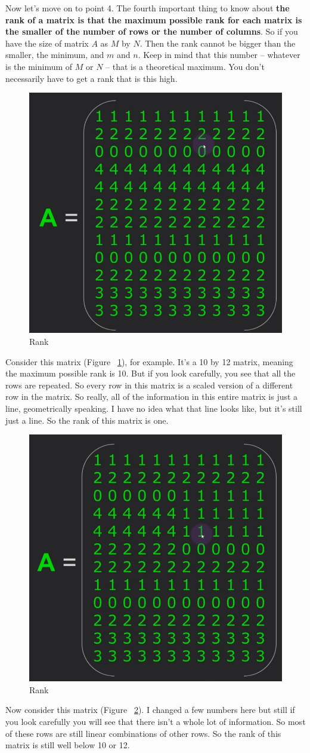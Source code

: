 \documentclass[fleqn,10pt]{olplainarticle}
\theoremstyle{definition}
\theoremstyle{remark}
\begin{document}
Now let's move on to point 4. The fourth important thing to know about \textbf{the rank of a matrix is that the maximum possible rank for each matrix is the smaller of the number of rows or the number of columns}. So if you have the size of matrix $A$ as $M$ by $N$. Then the rank cannot be bigger than the smaller, the minimum, and $m$ and $n$. Keep in mind that this number -- whatever is the minimum of $M$ or $N$ -- that is a theoretical maximum. You don't necessarily have to get a rank that is this high.

\begin{figure}[ht]
	\centering
	\includegraphics[width=0.25\linewidth]{images/rank-07.png}
	\caption{Rank}
	\label{fig:rank_07}
\end{figure}

Consider this matrix (Figure ~\ref{fig:rank_07}), for example. It's a 10 by 12 matrix, meaning the maximum possible rank is 10. But if you look carefully, you see that all the rows are repeated. So every row in this matrix is a scaled version of a different row in the matrix. So really, all of the information in this entire matrix is just a line, geometrically speaking. I have no idea what that line looks like, but it's still just a line. So the rank of this matrix is one.

\begin{figure}[ht]
	\centering
	\includegraphics[width=0.25\linewidth]{images/rank-08.png}
	\caption{Rank}
	\label{fig:rank_08}
\end{figure}

Now consider this matrix (Figure ~\ref{fig:rank_08}). I changed a few numbers here but still if you look carefully you will see that there isn't a whole lot of information. So most of these rows are still linear combinations of other rows. So the rank of this matrix is still well below 10 or 12. 
\end{document}
